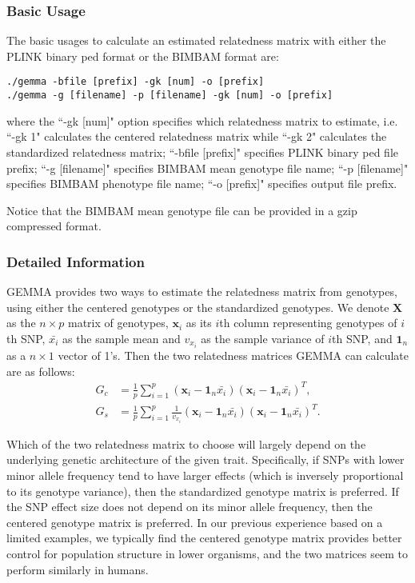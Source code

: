 \documentclass[11pt]{article}
\begin{document}
\subsubsection{Basic Usage}
The basic usages to calculate an estimated relatedness matrix with either the PLINK binary ped format or the BIMBAM format are:
%
\begin{verbatim}
./gemma -bfile [prefix] -gk [num] -o [prefix]
./gemma -g [filename] -p [filename] -gk [num] -o [prefix]
\end{verbatim}
%
where the ``-gk [num]" option specifies which relatedness matrix to estimate, i.e. ``-gk 1" calculates the centered relatedness matrix while ``-gk 2" calculates the standardized relatedness matrix; ``-bfile [prefix]" specifies PLINK binary ped file prefix; ``-g [filename]" specifies BIMBAM mean genotype file name; ``-p [filename]" specifies BIMBAM phenotype file name; ``-o [prefix]" specifies output file prefix. 

Notice that the BIMBAM mean genotype file can be provided in a gzip compressed format.

\subsubsection{Detailed Information}

GEMMA provides two ways to estimate the relatedness matrix from genotypes, using either the centered genotypes or the standardized genotypes. We denote $\mathbf X$ as the $n\times p$ matrix of genotypes, $\mathbf x_i$ as its $i$th column representing genotypes of $i$th SNP, $\bar{x_i}$ as the sample mean and $v_{x_i}$ as the sample variance of $i$th SNP, and $\mathbf 1_n$ as a $n\times 1$ vector of 1's. Then the two relatedness matrices GEMMA can calculate are as follows:
%
\begin{align*}
G_c&=\frac{1}{p}\sum_{i=1}^p (\mathbf x_i-\mathbf 1_n \bar{x_i})(\mathbf x_i-\mathbf 1_n \bar{x_i})^T, \\
G_s&=\frac{1}{p}\sum_{i=1}^p \frac{1}{v_{x_i}}(\mathbf x_i-\mathbf 1_n \bar{x_i})(\mathbf x_i-\mathbf 1_n \bar{x_i})^T.
\end{align*}
%

Which of the two relatedness matrix to choose will largely depend on the underlying genetic architecture of the given trait. Specifically, if SNPs with lower minor allele frequency tend to have larger effects (which is inversely proportional to its genotype variance), then the standardized genotype matrix is preferred. If the SNP effect size does not depend on its minor allele frequency, then the centered genotype matrix is preferred. In our previous experience based on a limited examples, we typically find the centered genotype matrix provides better control for population structure in lower organisms, and the two matrices seem to perform similarly in humans. 
\end{document}
